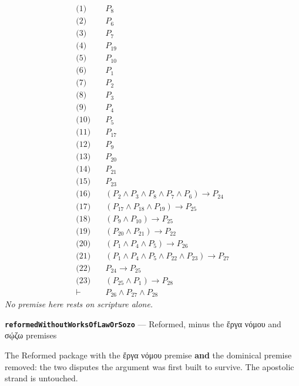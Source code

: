 \documentclass[11pt]{article}
\begin{document}
\begin{align*}
  \text{(1)} \quad & P_{8} \\
  \text{(2)} \quad & P_{6} \\
  \text{(3)} \quad & P_{7} \\
  \text{(4)} \quad & P_{19} \\
  \text{(5)} \quad & P_{10} \\
  \text{(6)} \quad & P_{1} \\
  \text{(7)} \quad & P_{2} \\
  \text{(8)} \quad & P_{3} \\
  \text{(9)} \quad & P_{4} \\
  \text{(10)} \quad & P_{5} \\
  \text{(11)} \quad & P_{17} \\
  \text{(12)} \quad & P_{9} \\
  \text{(13)} \quad & P_{20} \\
  \text{(14)} \quad & P_{21} \\
  \text{(15)} \quad & P_{23} \\
  \text{(16)} \quad & (P_{2} \land P_{3} \land P_{8} \land P_{7} \land P_{6}) \rightarrow P_{24} \\
  \text{(17)} \quad & (P_{17} \land P_{18} \land P_{19}) \rightarrow P_{25} \\
  \text{(18)} \quad & (P_{9} \land P_{10}) \rightarrow P_{25} \\
  \text{(19)} \quad & (P_{20} \land P_{21}) \rightarrow P_{22} \\
  \text{(20)} \quad & (P_{1} \land P_{4} \land P_{5}) \rightarrow P_{26} \\
  \text{(21)} \quad & (P_{1} \land P_{4} \land P_{5} \land P_{22} \land P_{23}) \rightarrow P_{27} \\
  \text{(22)} \quad & P_{24} \rightarrow P_{25} \\
  \text{(23)} \quad & (P_{25} \land P_{1}) \rightarrow P_{28} \\
  \vdash \quad & P_{26} \land P_{27} \land P_{28}
\end{align*}
\emph{No premise here rests on scripture alone.}
\par\medskip\noindent\textbf{\texttt{reformed\allowbreak{}Without\allowbreak{}Works\allowbreak{}Of\allowbreak{}Law\allowbreak{}Or\allowbreak{}Sozo}} --- Reformed, minus the ἔργα νόμου and σῴζω premises\par\nobreak\noindent
The Reformed package with the ἔργα νόμου premise \textbf{and} the dominical premise removed: the two disputes the argument was first built to survive. The apostolic strand is untouched.
\end{document}
